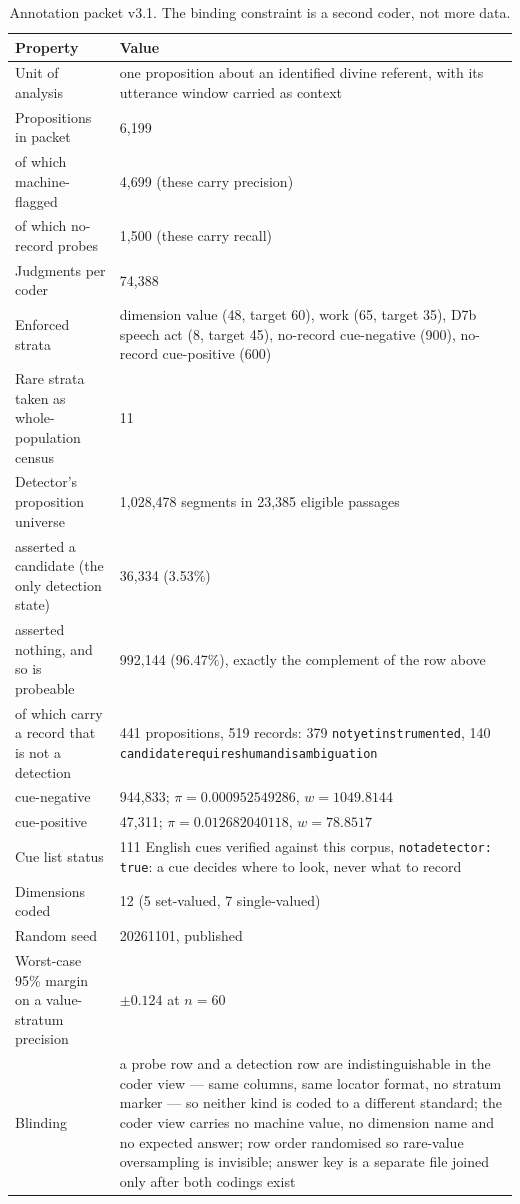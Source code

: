 \documentclass[11pt]{article}
\DeclareRobustCommand{\_}{\textunderscore\allowbreak}
\begin{document}
\begin{table}[t]
\centering
\small
\caption{Annotation packet v3.1. The binding constraint is a second coder, not more
data.}
\label{tab:packet}
\begin{tabular}{L{6.0cm} L{6.4cm}}
\toprule
Property & Value \\
\midrule
Unit of analysis & one proposition about an identified divine referent, with its utterance window carried as context \\
Propositions in packet & 6{,}199 \\
\quad of which machine-flagged & 4{,}699 (these carry precision) \\
\quad of which no-record probes & 1{,}500 (these carry recall) \\
Judgments per coder & 74{,}388 \\
Enforced strata & dimension value (48, target 60), work (65, target 35), D7b speech act (8, target 45), no-record cue-negative (900), no-record cue-positive (600) \\
Rare strata taken as whole-population census & 11 \\
Detector's proposition universe & 1{,}028{,}478 segments in 23{,}385 eligible passages \\
\quad asserted a candidate (the only detection state) & 36{,}334 (3.53\%) \\
\quad asserted nothing, and so is probeable & 992{,}144 (96.47\%), exactly the complement of the row above \\
\quad\quad of which carry a record that is not a detection & 441 propositions, 519 records: 379 \texttt{not\_yet\_instrumented}, 140 \texttt{candidate\_requires\_human\_disambiguation} \\
\quad\quad cue-negative & 944{,}833; \(\pi = 0.000952549286\), \(w = 1049.8144\) \\
\quad\quad cue-positive & 47{,}311; \(\pi = 0.012682040118\), \(w = 78.8517\) \\
Cue list status & 111 English cues verified against this corpus, \texttt{not\_a\_detector: true}: a cue decides where to look, never what to record \\
Dimensions coded & 12 (5 set-valued, 7 single-valued) \\
Random seed & 20261101, published \\
Worst-case 95\% margin on a value-stratum precision & \(\pm 0.124\) at \(n = 60\) \\
Blinding & a probe row and a detection row are indistinguishable in the coder view --- same columns, same locator format, no stratum marker --- so neither kind is coded to a different standard; the coder view carries no machine value, no dimension name and no expected answer; row order randomised so rare-value oversampling is invisible; answer key is a separate file joined only after both codings exist \\

\end{tabular}
\end{table}
\end{document}
